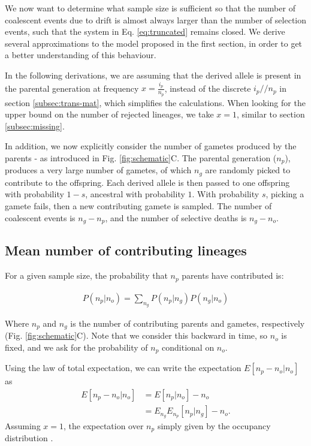 \documentclass[review]{elsarticle}
\newcommand{\dslash}{/\!\!/}
\begin{document}
We now want to determine what sample size is sufficient so that the number of coalescent events due
to drift is almost always larger than the number of selection events, such that the system in Eq.
\eqref{eq:truncated} remains closed. We derive several approximations to the model proposed in the
first section, in order to get a better understanding of this behaviour.

In the following derivations, we are assuming that the derived allele is present in the parental
generation at frequency $x = \frac{i_p}{n_p}$, instead of the discrete $i_p \dslash n_p$ in section
\ref{subsec:trans-mat}, which simplifies the calculations. When looking for the upper bound on the
number of rejected lineages, we take $x=1$, similar to section \ref{subsec:missing}.

In addition, we now explicitly consider the number of gametes produced by the parents - as
introduced in Fig. \ref{fig:schematic}C. The parental generation ($n_p$), produces a very large
number of gametes, of which $n_g$ are randomly picked to contribute to the offspring. Each derived
allele is then passed to one offspring with probability $1-s$, ancestral with probability $1$. With
probability $s$, picking a gamete fails, then a new contributing gamete is sampled. The number of
coalescent events is $n_g - n_p$, and the number of selective deaths is $n_g - n_o$.

\subsection{Mean number of contributing lineages}
\label{sec:mean-contr}

For a given sample size, the probability that $n_p$ parents have contributed is:

\begin{align}
  \label{eq:conditional}
  P(n_p | n_o) = \sum_{n_g} P(n_p | n_g)P(n_g | n_o)
\end{align}

Where $n_p$ and $n_g$ is the number of contributing parents and gametes, respectively (Fig.
\ref{fig:schematic}C). Note that we consider this backward in time, so $n_o$ is fixed, and we ask
for the probability of $n_p$ conditional on $n_o$.

Using the law of total expectation, we can write the expectation $E[n_p-n_o | n_o]$ as 
\begin{equation*}
  \begin{aligned}
    \label{eq:lineages-approx}
    E[n_p-n_o | n_o] &=        E[n_p | n_o]       - n_o \\
                     &=E_{n_g} E_{n_p}[n_p | n_g] - n_o.
  \end{aligned}
\end{equation*}
Assuming $x=1$, the expectation over $n_p$ simply given by the occupancy distribution \cite{Wakeley2009}.
\end{document}
